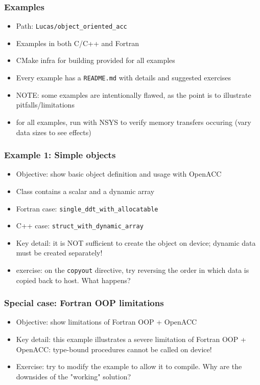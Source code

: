 \begin{frame}
	\frametitle{Examples}
    \begin{itemize}
        \item Path: \texttt{Lucas/object\_oriented\_acc}
        \item Examples in both C/C++ and Fortran
        \item CMake infra for building provided for all examples
        \item Every example has a \texttt{README.md} with details and suggested exercises
        \item NOTE: some examples are intentionally flawed, as the point is to illustrate pitfalls/limitations
        \item for all examples, run with NSYS to verify memory transfers occuring (vary data sizes to see effects)
    \end{itemize}
\end{frame}

\begin{frame}
    \frametitle{Example 1: Simple objects}
    \begin{itemize}
        \item Objective: show basic object definition and usage with OpenACC
        \item Class contains a scalar and a dynamic array
        \item Fortran case: \texttt{single\_ddt\_with\_allocatable}
        \item C++ case: \texttt{struct\_with\_dynamic\_array}
        \item Key detail: it is NOT sufficient to create the object on device; dynamic data must be created separately!
        \item exercise: on the \texttt{copyout} directive, try reversing the order in which data is copied back to host. What happens?
    \end{itemize}
\end{frame}

\begin{frame}
    \frametitle{Special case: Fortran OOP limitations}
    \begin{itemize}
        \item Objective: show limitations of Fortran OOP + OpenACC
        \item Key detail: this example illustrates a severe limitation of Fortran OOP + OpenACC: type-bound procedures cannot be called on device!
        \item Exercise: try to modify the example to allow it to compile. Why are the downsides of the "working" solution?
    \end{itemize}
\end{frame}

